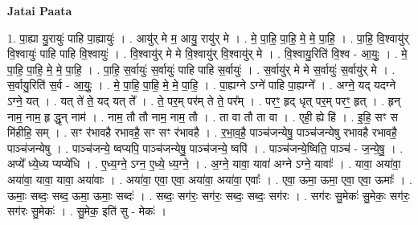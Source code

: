 \documentclass[17pt]{extarticle}
\begin{document}
\textbf{Jatai Paata} \newline

1. पा॒ह्या यु॒रायुः॑ पाहि पा॒ह्यायुः॑ । . आयु॑र् मे म॒ आयु॒ रायु॑र् मे । . मे॒ पा॒हि॒ पा॒हि॒ मे॒ मे॒ पा॒हि॒ । . पा॒हि॒ वि॒श्वायु॑र् वि॒श्वायुः॑ पाहि पाहि वि॒श्वायुः॑ । . वि॒श्वायु॑र् मे मे वि॒श्वायु॑र् वि॒श्वायु॑र् मे । . वि॒श्वायु॒रिति॑ वि॒श्व - आ॒युः॒ । . मे॒ पा॒हि॒ पा॒हि॒ मे॒ मे॒ पा॒हि॒ । . पा॒हि॒ स॒र्वायुः॑ स॒र्वायुः॑ पाहि पाहि स॒र्वायुः॑ । . स॒र्वायु॑र् मे मे स॒र्वायुः॑ स॒र्वायु॑र् मे । . स॒र्वायु॒रिति॑ स॒र्व - आ॒युः॒ । . मे॒ पा॒हि॒ पा॒हि॒ मे॒ मे॒ पा॒हि॒ । . पा॒ह्यग्ने ऽग्ने॑ पाहि पा॒ह्यग्ने᳚ । . अग्ने॒ यद् यदग्ने ऽग्ने॒ यत् । . यत् ते॑ ते॒ यद् यत् ते᳚ । . ते॒ पर॒म् पर॑म् ते ते॒ पर᳚म् । . परꣳ॒॒ हृद् धृत् पर॒म् परꣳ॒॒ हृत् । . हृन् नाम॒ नाम॒ हृ द्धृन् नाम॑ । . नाम॒ तौ तौ नाम॒ नाम॒ तौ । . ता वा तौ ता वा । . एही॒ ह्ये हि॑ । . इ॒हि॒ सꣳ स मि॑हीहि॒ सम् । . सꣳ र॑भावहै रभावहै॒ सꣳ सꣳ र॑भावहै । . र॒भा॒व॒है॒ पाञ्च॑जन्येषु॒ पाञ्च॑जन्येषु रभावहै रभावहै॒ पाञ्च॑जन्येषु । . पाञ्च॑जन्ये॒ ष्वप्यपि॒ पाञ्च॑जन्येषु॒ पाञ्च॑जन्ये॒ ष्वपि॑ । . पाञ्च॑जन्ये॒ष्विति॒ पाञ्च॑ - ज॒न्ये॒षु॒ । . अप्ये᳚ ध्ये॒ध्य प्यप्ये॑धि । . ए॒ध्य॒ग्ने॒ ऽग्न॒ ए॒ध्ये॒ ध्य॒ग्ने॒ । . अ॒ग्ने॒ यावा॒ यावा॑ अग्ने ऽग्ने॒ यावाः᳚ । . यावा॒ अया॑वा॒ अया॑वा॒ यावा॒ यावा॒ अया॑वाः । . अया॑वा॒ एवा॒ एवा॒ अया॑वा॒ अया॑वा॒ एवाः᳚ । . एवा॒ ऊमा॒ ऊमा॒ एवा॒ एवा॒ ऊमाः᳚ । . ऊमाः॒ सब्दः॒ सब्द॒ ऊमा॒ ऊमाः॒ सब्दः॑ । . सब्दः॒ सग॑रः॒ सग॑रः॒ सब्दः॒ सब्दः॒ सग॑रः । . सग॑रः सु॒मेकः॑ सु॒मेकः॒ सग॑रः॒ सग॑रः सु॒मेकः॑ । . सु॒मेक॒ इति॑ सु - मेकः॑ । \newline
\end{document}
